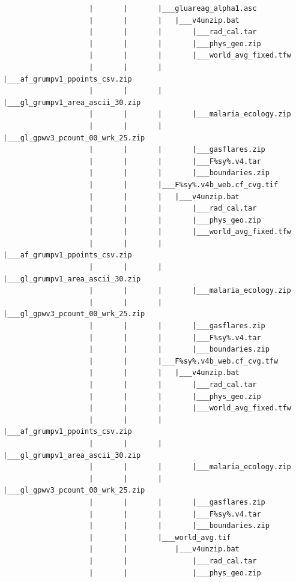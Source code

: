 \documentclass[]{book}
\begin{document}
\begin{verbatim}
                    |       |       |___gluareag_alpha1.asc
                    |       |       |   |___v4unzip.bat
                    |       |       |       |___rad_cal.tar
                    |       |       |       |___phys_geo.zip
                    |       |       |       |___world_avg_fixed.tfw
                    |       |       |       |___af_grumpv1_ppoints_csv.zip
                    |       |       |       |___gl_grumpv1_area_ascii_30.zip
                    |       |       |       |___malaria_ecology.zip
                    |       |       |       |___gl_gpwv3_pcount_00_wrk_25.zip
                    |       |       |       |___gasflares.zip
                    |       |       |       |___F%sy%.v4.tar
                    |       |       |       |___boundaries.zip
                    |       |       |___F%sy%.v4b_web.cf_cvg.tif
                    |       |       |   |___v4unzip.bat
                    |       |       |       |___rad_cal.tar
                    |       |       |       |___phys_geo.zip
                    |       |       |       |___world_avg_fixed.tfw
                    |       |       |       |___af_grumpv1_ppoints_csv.zip
                    |       |       |       |___gl_grumpv1_area_ascii_30.zip
                    |       |       |       |___malaria_ecology.zip
                    |       |       |       |___gl_gpwv3_pcount_00_wrk_25.zip
                    |       |       |       |___gasflares.zip
                    |       |       |       |___F%sy%.v4.tar
                    |       |       |       |___boundaries.zip
                    |       |       |___F%sy%.v4b_web.cf_cvg.tfw
                    |       |       |   |___v4unzip.bat
                    |       |       |       |___rad_cal.tar
                    |       |       |       |___phys_geo.zip
                    |       |       |       |___world_avg_fixed.tfw
                    |       |       |       |___af_grumpv1_ppoints_csv.zip
                    |       |       |       |___gl_grumpv1_area_ascii_30.zip
                    |       |       |       |___malaria_ecology.zip
                    |       |       |       |___gl_gpwv3_pcount_00_wrk_25.zip
                    |       |       |       |___gasflares.zip
                    |       |       |       |___F%sy%.v4.tar
                    |       |       |       |___boundaries.zip
                    |       |       |___world_avg.tif
                    |       |           |___v4unzip.bat
                    |       |               |___rad_cal.tar
                    |       |               |___phys_geo.zip

\end{verbatim}
\end{document}
